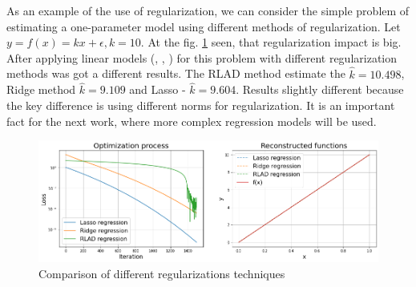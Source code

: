 As an example of the use of regularization, we can consider the simple problem of estimating a one-parameter model using different methods of regularization. Let $y = f(x) = k  x + \epsilon, k = 10$. At the fig. \ref{fig:regularizations} seen, that regularization impact is big. After applying linear models (\cite{ridge}, \cite{lasso}, \cite{rlad}) for this problem with different regularization methods was got a different results. The RLAD method estimate the $\hat{k} = 10.498$, Ridge method $\hat{k} = 9.109$ and Lasso - $\hat{k} = 9.604$. Results slightly different because the key difference is using different norms for regularization. It is an important fact for the next work, where more complex regression models will be used. 

\begin{figure}[h]
	\centering
	\includegraphics[width=\textwidth]{images/chapter2/reularization_impact.png}
	\caption{Comparison of different regularizations techniques}
	\label{fig:regularizations}
\end{figure}